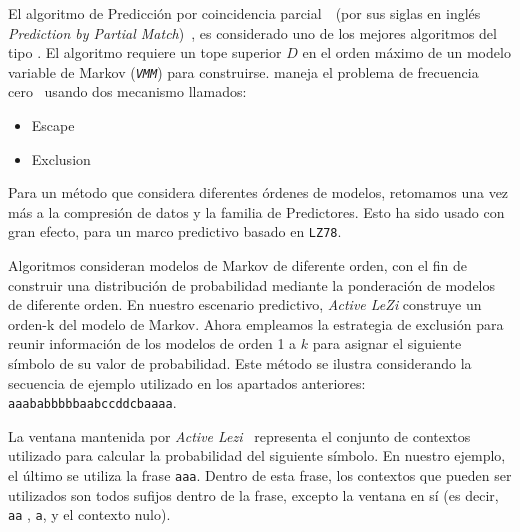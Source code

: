 


El algoritmo de Predicción por coincidencia parcial~\PPM~(por sus siglas en inglés \emph{Prediction by Partial Match})~\cite{Shkarin2002 }, es considerado uno de los mejores algoritmos del tipo \losslessdatacompression. El algoritmo requiere un tope superior $D$ en el orden máximo  de un modelo variable de Markov (\emph{\texttt{VMM}}) para construirse. \PPM maneja el problema de frecuencia cero~\cite{Begleiter2004} usando dos mecanismo llamados:
	\begin{itemize}
		\menorEspacioItemize
		\item Escape
		\item Exclusion
	\end{itemize}
	
Para un método que considera diferentes órdenes de modelos, retomamos una vez más a la compresión de datos y la familia de Predictores.  Esto ha sido usado con gran efecto, para un marco predictivo basado en \texttt{LZ78}. 

Algoritmos  \PPM consideran modelos de Markov de diferente orden,  con el fin de construir una distribución de probabilidad mediante la ponderación de modelos de diferente orden. En nuestro escenario predictivo, \emph{Active LeZi} construye un orden-k del modelo de Markov. Ahora empleamos la estrategia \PPM de exclusión para reunir información de los modelos de orden 1 a $k$ para asignar el siguiente símbolo de su valor de probabilidad. Este método se ilustra considerando la secuencia de ejemplo utilizado en los apartados anteriores: \texttt{aaababbbbbaabccddcbaaaa}.

La ventana mantenida por \emph{Active Lezi}~\cite{Gopalratnam2007} representa el conjunto de contextos utilizado para calcular la probabilidad  del siguiente símbolo. En nuestro ejemplo, el último se utiliza la frase \texttt{aaa}. Dentro de esta frase, los contextos que pueden ser utilizados son todos sufijos dentro de la frase, excepto la ventana en sí (es decir, \texttt{aa} , \texttt{a}, y el contexto nulo).

	
